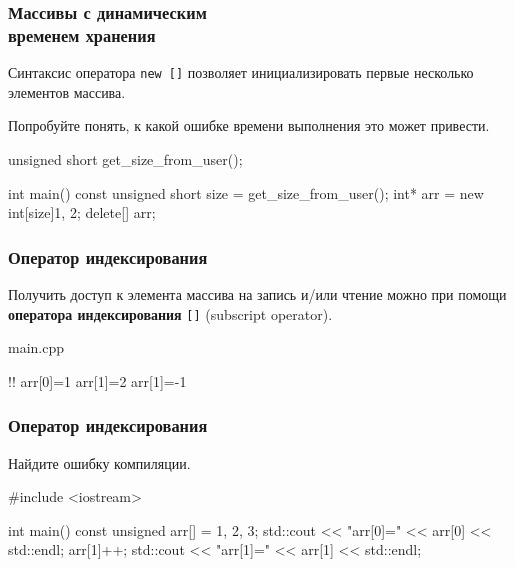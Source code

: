 \documentclass[compress, 8pt]{beamer}
\begin{document}
\begin{frame}[fragile]

    \frametitle{Массивы с динамическим \\ временем хранения}

    Синтаксис оператора \verb|new []| позволяет инициализировать
    первые несколько элементов массива.

    \begin{task}
        Попробуйте понять, к какой ошибке времени выполнения
        это может привести.
    \end{task}

    \begin{myinplacelisting}[minted language=cpp]
unsigned short get_size_from_user();

int main() {
    const unsigned short size = get_size_from_user();
    int* arr = new int[size]{1, 2};
    delete[] arr;
}
    \end{myinplacelisting}

\end{frame}

\begin{frame}[fragile]

    \frametitle{Оператор индексирования}

    \hfill \break
    Получить доступ к элемента массива на запись и/или чтение
    можно при помощи \textbf{оператора индексирования}\footnotemark{} \verb|[]|
    (subscript operator).


        {main.cpp}

    \begin{terminalwindow}
!!
arr[0]=1
arr[1]=2
arr[1]=-1
    \end{terminalwindow}

\end{frame}

\begin{frame}[fragile]

    \frametitle{Оператор индексирования}

    \begin{task}
        Найдите ошибку компиляции.
    \end{task}

    \begin{myinplacelisting}[minted language=cpp]
#include <iostream>

int main() {
    const unsigned arr[] = {1, 2, 3};
    std::cout << "arr[0]=" << arr[0] << std::endl;
    arr[1]++;
    std::cout << "arr[1]=" << arr[1] << std::endl;
}
    \end{myinplacelisting}

\end{frame}
\end{document}
